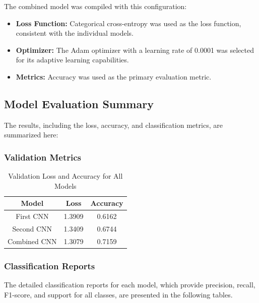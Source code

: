 \documentclass{article}
\begin{document}
The combined model was compiled with this configuration:
\begin{itemize}
    \item \textbf{Loss Function:} Categorical cross-entropy was used as the loss function, consistent with the individual models.
    \item \textbf{Optimizer:} The Adam optimizer with a learning rate of 0.0001 was selected for its adaptive learning capabilities.
    \item \textbf{Metrics:} Accuracy was used as the primary evaluation metric.
\end{itemize}

\subsection{Model Evaluation Summary}

The results, including the loss, accuracy, and classification metrics, are summarized here:

\subsubsection{Validation Metrics}

\begin{table}[h!]
    \centering
    \begin{tabular}{|c|c|c|}
        \hline
        \textbf{Model} & \textbf{Loss} & \textbf{Accuracy} \\
        \hline
        First CNN & 1.3909 & 0.6162 \\
        Second CNN & 1.3409 & 0.6744 \\
        Combined CNN & 1.3079 & 0.7159 \\
        \hline
    \end{tabular}
    \caption{Validation Loss and Accuracy for All Models}
    \label{tab:validation_metrics_summary}
\end{table}

\subsubsection{Classification Reports}

The detailed classification reports for each model, which provide precision, recall, F1-score, and support for all classes, are presented in the following tables.
\end{document}
